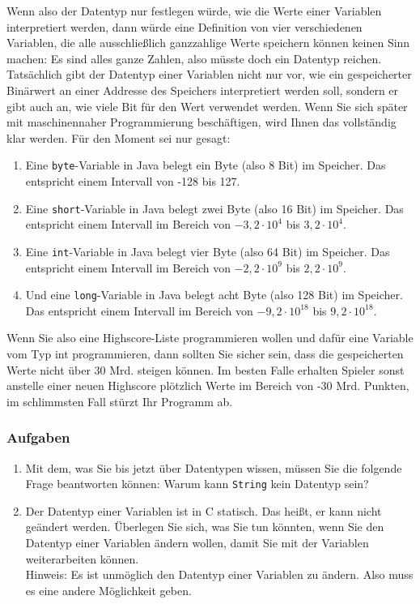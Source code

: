 Wenn also der Datentyp nur festlegen würde, wie die Werte einer Variablen interpretiert werden, dann würde eine Definition von vier verschiedenen Variablen, die alle ausschließlich ganzzahlige Werte speichern können keinen Sinn machen: Es sind alles ganze Zahlen, also müsste doch ein Datentyp reichen.\\

Tatsächlich gibt der Datentyp einer Variablen nicht nur vor, wie ein gespeicherter Binärwert an einer Addresse des Speichers interpretiert werden soll, sondern er gibt auch an, wie viele Bit für den Wert verwendet werden. Wenn Sie sich später mit maschinennaher Programmierung beschäftigen, wird Ihnen das vollständig klar werden. Für den Moment sei nur gesagt:

\begin{enumerate}
	\item Eine \verb|byte|-Variable in Java belegt ein Byte (also 8 Bit) im Speicher. Das entspricht einem Intervall von -128 bis 127.
	\item Eine \verb|short|-Variable in Java belegt zwei Byte (also 16 Bit) im Speicher.
	Das entspricht einem Intervall im Bereich von \(-3,2 \cdot 10^4\) bis \(3,2 \cdot 10^4\).
	\item Eine \verb|int|-Variable in Java belegt vier Byte (also 64 Bit) im Speicher. Das entspricht einem Intervall im Bereich von \(-2,2 \cdot 10^9\) bis \(2,2 \cdot 10^9\).
	\item Und eine \verb|long|-Variable in Java belegt acht Byte (also 128 Bit) im Speicher. Das entspricht einem Intervall im Bereich von \(-9,2 \cdot 10^18\) bis \(9,2 \cdot 10^18\).
\end{enumerate}

Wenn Sie also eine Highscore-Liste programmieren wollen und dafür eine Variable vom Typ int programmieren, dann sollten Sie sicher sein, dass die gespeicherten Werte nicht über 30 Mrd. steigen können. Im besten Falle erhalten Spieler sonst anstelle einer neuen Highscore plötzlich Werte im Bereich von -30 Mrd. Punkten, im schlimmsten Fall stürzt Ihr Programm ab.\\

\subsubsection{Aufgaben}

\begin{enumerate}
	\item Mit dem, was Sie bis jetzt über Datentypen wissen, müssen Sie die folgende Frage beantworten können: Warum kann \verb|String| kein Datentyp sein?
	\item Der Datentyp einer Variablen ist in C statisch. Das heißt, er kann nicht geändert werden. Überlegen Sie sich, was Sie tun könnten, wenn Sie den Datentyp einer Variablen ändern wollen, damit Sie mit der Variablen weiterarbeiten können. \\
	Hinweis: Es ist unmöglich den Datentyp einer Variablen zu ändern. Also muss es eine andere Möglichkeit geben.	
\end{enumerate}

